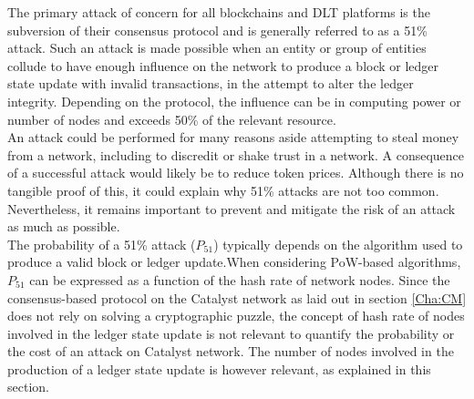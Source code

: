 The primary attack of concern for all blockchains and DLT platforms is the subversion of their consensus protocol and is generally referred to as a 51\% attack. Such an attack is made possible when an entity or group of entities collude to have enough influence on the network to produce a block or ledger state update with invalid transactions, in the attempt to alter the ledger integrity. Depending on the protocol, the influence can be in computing power or number of nodes and exceeds 50\% of the relevant resource. \\

An attack could be performed for many reasons aside attempting to steal money from a network, including to discredit or shake trust in a network. A consequence of a successful attack would likely be to reduce token prices. Although there is no tangible proof of this, it could explain why 51\% attacks are not too common. Nevertheless, it remains important to prevent and mitigate the risk of an attack as much as possible.\\

The probability of a 51\% attack ($P_{51}$) typically depends on the algorithm used to produce a valid block or ledger update.When considering PoW-based algorithms, $P_{51}$ can be expressed as a function of the hash rate of network nodes. Since the consensus-based protocol on the Catalyst network as laid out in section \ref{Cha:CM} does not rely on solving a cryptographic puzzle, the concept of hash rate of nodes involved in the ledger state update is not relevant to quantify the probability or the cost of an attack on Catalyst network. The number of nodes involved in the production of a ledger state update is however relevant, as explained in this section. \\ 

